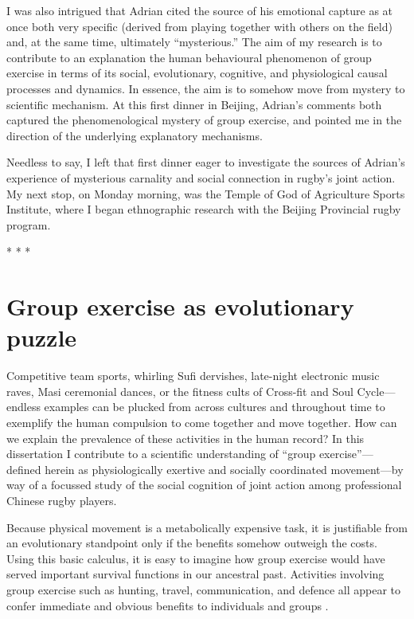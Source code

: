 \begin{CJK}{UTF8}{gbsn}
I was also intrigued that Adrian cited the source of his emotional capture as at once both very specific (derived from playing together with others on the field) and, at the same time, ultimately ``mysterious.''  The aim of my research is to contribute to an explanation the human behavioural phenomenon of group exercise in terms of its social, evolutionary, cognitive, and physiological causal processes and dynamics.  In essence, the aim is to somehow move from mystery to scientific mechanism.  At this first dinner in Beijing, Adrian's comments both captured the phenomenological mystery of group exercise, and pointed me in the direction of the underlying explanatory mechanisms.

Needless to say, I left that first dinner eager to investigate the sources of Adrian's experience of mysterious carnality and social connection in rugby's joint action.  My next stop, on Monday morning, was the Temple of God of Agriculture Sports Institute, where I began ethnographic research with the Beijing Provincial rugby program.


                            \begin{center}
                              * * *
                            \end{center}





\section{Group exercise as evolutionary puzzle}
Competitive team sports, whirling Sufi dervishes, late-night electronic music raves, Masi ceremonial dances, or the fitness cults of Cross-fit and Soul Cycle---endless examples can be plucked from across cultures and throughout time to exemplify the human compulsion to come together and move together.  How can we explain the prevalence of these activities in the human record?  In this dissertation I contribute to a scientific understanding of ``group exercise''---defined herein as physiologically exertive and socially coordinated movement---by way of a focussed study of the social cognition of joint action among professional Chinese rugby players.

Because physical movement is a metabolically expensive task, it is justifiable from an evolutionary standpoint only if the benefits somehow outweigh the costs.  Using this basic calculus, it is easy to imagine how group exercise would have served important survival functions in our ancestral past.  Activities involving group exercise such as hunting, travel, communication, and defence all appear to confer immediate and obvious benefits to individuals and groups \citep{Sands2010}.


\end{CJK}
